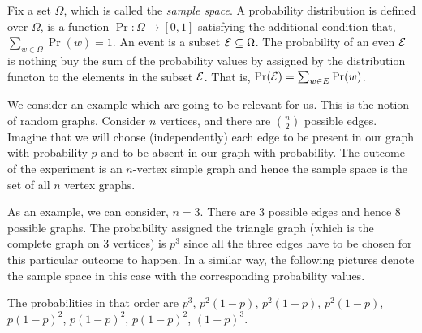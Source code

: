 Fix a set $\Omega$, which is called the {\em sample space}.
A probability distribution is defined over $\Omega$, is a function $\Pr: \Omega \to [0,1]$ satisfying the additional condition that, $\sum_{w \in \Omega} \Pr(w) = 1$. An event is a subset ${\cal{E}} \subseteq \Omega$. The probability of an even $\cal{E}$ is nothing buy the sum of the probability values by assigned by the distribution functon to the elements in the subset $\cal{E}$. That is, $\Pr({\cal{E}}) = \sum_{w \in E} \Pr(w)$.

We consider an example which are going to be relevant for us. This is the notion of random graphs. Consider $n$ vertices, and there are ${n \choose 2}$ possible edges. Imagine that we will choose (independently) each edge to be present in our graph with probability $p$ and to be absent in our graph with probability. The outcome of the experiment is an $n$-vertex simple graph and hence the sample space is the set of all $n$ vertex graphs.

As an example, we can consider, $n=3$. There are $3$ possible edges and hence $8$ possible graphs. The probability assigned the triangle graph (which is the complete graph on $3$ vertices) is $p^3$ since all the three edges have to be chosen for this particular outcome to happen. In a similar way, the following pictures denote the sample space in this case with the corresponding probability values.\\

\begin{center}
\end{center}

\noindent The probabilities in that order are $p^3$, $p^2(1-p)$, $p^2(1-p)$, $p^2(1-p)$, $p(1-p)^2$, $p(1-p)^2$, $p(1-p)^2$, $(1-p)^3$.

